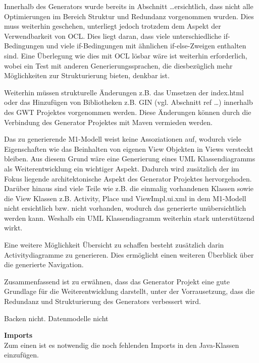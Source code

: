 Innerhalb des Generators wurde bereits in Abschnitt \ldots ersichtlich, dass
nicht alle Optimierungen im Bereich Struktur und Redundanz vorgenommen wurden.
Dies muss weiterhin geschehen, unterliegt jedoch trotzdem dem Aspekt der
Verwendbarkeit von OCL. Dies liegt daran, dass viele
unterschiedliche if-Bedingungen und viele if-Bedingungen mit ähnlichen
if-else-Zweigen enthalten sind. Eine Überlegung wie dies mit OCL lösbar wäre
ist weiterhin erforderlich, wobei ein Test mit anderen Generierungssprachen,
die diesbezüglich mehr Möglichkeiten zur Strukturierung bieten, denkbar ist.

Weiterhin müssen strukturelle Änderungen z.B. das Umsetzen der
index.html oder das Hinzufügen von Bibliotheken z.B. GIN (vgl. Abschnitt ref
\ldots) innerhalb des GWT Projektes vorgenommen werden. Diese Änderungen können
durch die Verbindung des Generator Projektes mit Maven vermieden werden.

Das zu generierende M1-Modell weist keine Assoziationen auf, wodurch viele
Eigenschaften wie das Beinhalten von eigenen View Objekten in Views versteckt
bleiben. Aus diesem Grund wäre eine Generierung eines UML Klassendiagramms als
Weiterentwicklung ein wichtiger Aspekt. Dadurch wird zusätzlich der im Fokus
liegende architektonische Aspekt des Generator Projektes hervorgehoden.
Darüber hinaus sind viele Teile wie z.B. die einmalig vorhandenen Klassen sowie die View
Klassen z.B. Activity, Place und ViewImpl.ui.xml in dem M1-Modell nicht
ersichtlich bzw. nicht vorhanden, wodurch das generierte unübersichtlich werden
kann. Weshalb ein UML Klassendiagramm weiterhin stark unterstützend wirkt. 

Eine weitere Möglichkeit Übersicht zu schaffen besteht zusätzlich darin
Activitydiagramme zu generieren. Dies ermöglicht einen weiteren Überblick über
die generierte Navigation.

Zusammenfassend ist zu erwähnen, dass das Generator Projekt eine gute
Grundlage für die Weiterentwicklung darstellt, unter der Vorrausetzung, dass die
Redundanz und Strukturierung des Generators verbessert wird.

Backen nicht. Datenmodelle nicht

  \textbf{Imports} \\
  Zum einen ist es notwendig die noch fehlenden Imports in den Java-Klassen
  einzufügen.
